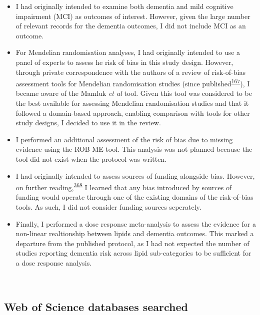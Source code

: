 \documentclass[a4paper, twoside]{templates/ociamthesis}
\begin{document}
\begin{itemize}
\item
  I had originally intended to examine both dementia and mild cognitive impairment (MCI) as outcomes of interest. However, given the large number of relevant records for the dementia outcomes, I did not include MCI as an outcome.
\item
  For Mendelian randomisation analyses, I had originally intended to use a panel of experts to assess he risk of bias in this study design. However, through private correspondence with the authors of a review of risk-of-bias assessment tools for Mendelian randomisation studies (since published\textsuperscript{\protect\hyperlink{ref-spiga2021}{167}}), I became aware of the Mamluk \emph{et al} tool. Given this tool was considered to be the best available for assessing Mendelian randomisation studies and that it followed a domain-based approach, enabling comparison with tools for other study designs, I decided to use it in the review.
\item
  I performed an additional assessment of the risk of bias due to missing evidence using the ROB-ME tool. This analysis was not planned because the tool did not exist when the protocol was written.
\item
  I had originally intended to assess sources of funding alongside bias. However, on further reading,\textsuperscript{\protect\hyperlink{ref-sterne2013}{368}} I learned that any bias introduced by sources of funding would operate through one of the existing domains of the risk-of-bias tools. As such, I did not consider funding sources seperately.
\item
  Finally, I performed a dose response meta-analysis to assess the evidence for a non-linear realtionship between lipids and dementia outcomes. This marked a departure from the published protocol, as I had not expected the number of studies reporting dementia risk across lipid sub-categories to be sufficient for a dose response analysis.
\end{itemize}

~

\hypertarget{appendix-wos-databases}{%
\subsection{Web of Science databases searched}\label{appendix-wos-databases}}
\end{document}
